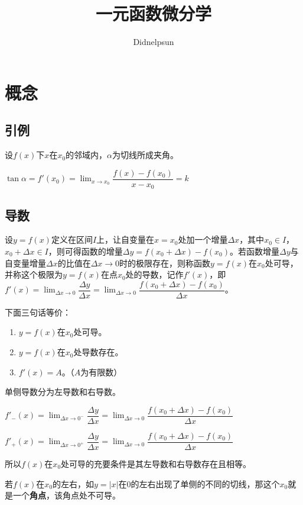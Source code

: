 \documentclass[UTF8]{ctexart}
\author{Didnelpsun}
\title{一元函数微分学}
\begin{document}
\maketitle
\thispagestyle{empty}
\tableofcontents
\thispagestyle{empty}
\newpage
\pagestyle{plain}
\setcounter{page}{1}
\section{概念}
\subsection{引例}

设$f(x)$下$x$在$x_0$的邻域内，$\alpha$为切线所成夹角。

$\tan\alpha=f'(x_0)=\lim_{x\to x_0}\dfrac{f(x)-f(x_0)}{x-x_0}=k$

\subsection{导数}

设$y=f(x)$定义在区间$I$上，让自变量在$x=x_0$处加一个增量$\Delta x$，其中$x_0\in I$，$x_0+\Delta x\in I$，则可得函数的增量$\Delta y=f(x_0+\Delta x)-f(x_0)$。若函数增量$\Delta y$与自变量增量$\Delta x$的比值在$\Delta x\to 0$时的极限存在，则称函数$y=f(x)$在$x_0$处可导，并称这个极限为$y=f(x)$在点$x_0$处的导数，记作$f'(x)$，即$f'(x)=\lim_{\Delta x\to 0}\dfrac{\Delta y}{\Delta x}=\lim_{\Delta x\to 0}\dfrac{f(x_0+\Delta x)-f(x_0)}{\Delta x}$。

下面三句话等价：

\begin{enumerate}
    \item $y=f(x)$在$x_0$处可导。
    \item $y=f(x)$在$x_0$处导数存在。
    \item $f'(x)=A$。（$A$为有限数）
\end{enumerate}

单侧导数分为左导数和右导数。

$f'_-(x)=\lim_{\Delta x\to 0^-}\dfrac{\Delta y}{\Delta x}=\lim_{\Delta x\to 0}\dfrac{f(x_0+\Delta x)-f(x_0)}{\Delta x}$

$f'_+(x)=\lim_{\Delta x\to 0^+}\dfrac{\Delta y}{\Delta x}=\lim_{\Delta x\to 0}\dfrac{f(x_0+\Delta x)-f(x_0)}{\Delta x}$

所以$f(x)$在$x_0$处可导的充要条件是其左导数和右导数存在且相等。

若$f(x)$在$x_0$的左右，如$y=\vert x\vert$在$0$的左右出现了单侧的不同的切线，那这个$x_0$就是一个\textbf{角点}，该角点处不可导。
\end{document}

